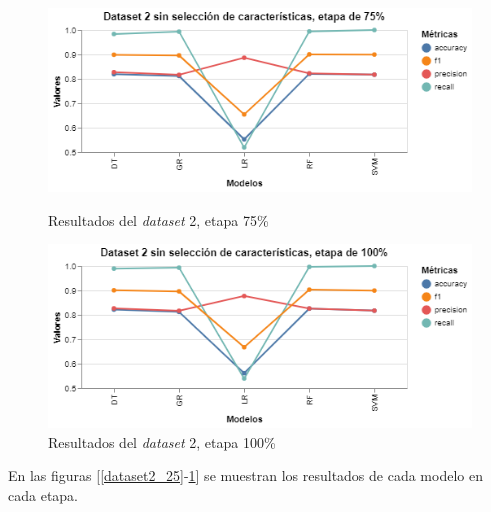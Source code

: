 \begin{figure}[htbp]
    \centering
    \begin{minipage}[t]{0.50\textwidth}
        \centering
        \includegraphics[width = \textwidth]{Graphics/dataset_2_75.png}
        \caption{Resultados del \textit{dataset} 2, etapa 75\%}
        \label{dataset2_75}
    \end{minipage}\hfill
    \begin{minipage}[t]{0.50\textwidth}
        \centering
        \includegraphics[width = \textwidth]{Graphics/dataset_2_100.png}
        \caption{Resultados del \textit{dataset} 2, etapa 100\%}
        \label{dataset2_100}
    \end{minipage}
\end{figure}

En las figuras [\ref{dataset2_25}-\ref{dataset2_100}] se muestran los resultados de cada modelo en cada etapa.  


